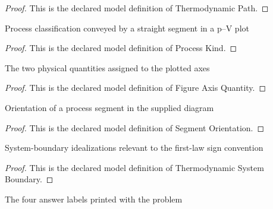 \begin{proof}
  This is the declared model definition of Thermodynamic Path.
\end{proof}
\begin{definition}
  \label{def:physics:phyx-mini-0341:phyxminiproblems-problemphyxmini0341-processkind}
  Process classification conveyed by a straight segment in a p--V plot
\end{definition}
\begin{proof}
  This is the declared model definition of Process Kind.
\end{proof}
\begin{definition}
  \label{def:physics:phyx-mini-0341:phyxminiproblems-problemphyxmini0341-figureaxisquantity}
  The two physical quantities assigned to the plotted axes
\end{definition}
\begin{proof}
  This is the declared model definition of Figure Axis Quantity.
\end{proof}
\begin{definition}
  \label{def:physics:phyx-mini-0341:phyxminiproblems-problemphyxmini0341-segmentorientation}
  Orientation of a process segment in the supplied diagram
\end{definition}
\begin{proof}
  This is the declared model definition of Segment Orientation.
\end{proof}
\begin{definition}
  \label{def:physics:phyx-mini-0341:phyxminiproblems-problemphyxmini0341-thermodynamicsystemboundary}
  System-boundary idealizations relevant to the first-law sign convention
\end{definition}
\begin{proof}
  This is the declared model definition of Thermodynamic System Boundary.
\end{proof}
\begin{definition}
  \label{def:physics:phyx-mini-0341:phyxminiproblems-problemphyxmini0341-answerchoice}
  The four answer labels printed with the problem
\end{definition}
